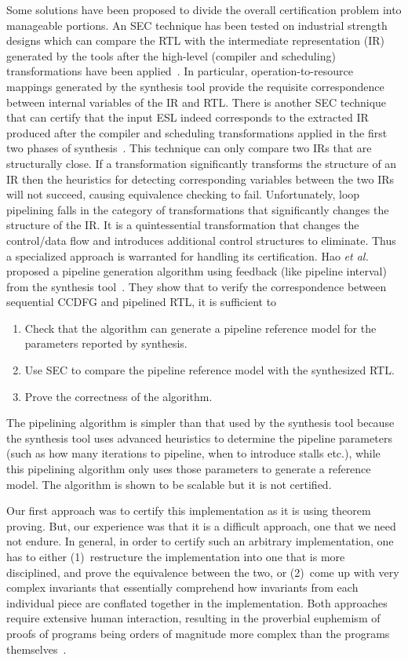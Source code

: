 Some solutions have been proposed to divide the overall certification problem into manageable portions.
An SEC technique has been tested on industrial strength designs which can compare the RTL 
with the intermediate representation (IR) generated by the tools after the high-level (compiler and scheduling)
transformations have been applied~\cite{rhcxy:atva-09,hxry:date-10}.  In particular,
operation-to-resource mappings generated by the synthesis
tool provide the requisite correspondence between internal
variables of the IR and RTL. There is another SEC technique that 
can certify that the input ESL indeed corresponds to the extracted 
IR produced after the compiler and scheduling transformations applied in the
first two phases of synthesis~\cite{zhenkun:iccd-13}. This technique
can only compare two IRs that are structurally close.  If a
transformation significantly transforms the structure of an IR then
the heuristics for detecting corresponding variables between the two
IRs will not succeed, causing equivalence checking to fail.
Unfortunately, loop pipelining falls in the category of
transformations that significantly changes the structure of the IR.
It is a quintessential transformation that changes the control/data
flow and introduces additional control structures
to eliminate. Thus a specialized approach is warranted for
handling its certification. Hao {\em et al.} proposed a pipeline generation algorithm using feedback (like pipeline interval) from the synthesis tool~\cite{hrx:dac-12}. 
They show that to verify the correspondence between sequential CCDFG and pipelined RTL, it is sufficient to
\begin{enumerate} 
\item Check that the algorithm can generate a pipeline reference model for the parameters reported by synthesis.
\item Use SEC to compare the pipeline reference model with the synthesized RTL.
\item Prove the correctness of the algorithm. 
\end{enumerate}
The pipelining algorithm is simpler than that used by the synthesis tool because the synthesis tool uses advanced heuristics to determine the pipeline parameters (such as how many iterations to pipeline, when to introduce stalls etc.), while this pipelining algorithm only uses those parameters to generate a reference model. The algorithm is shown to be scalable but it is not certified. 

Our first approach was to certify this implementation as it is using theorem proving. 
But, our experience was that it is a difficult approach, one that we need not endure. 
In general, in order to certify such an arbitrary implementation,
one has to either (1)~restructure the implementation into
one that is more disciplined, and prove the equivalence
between the two, or (2)~come up with very complex
invariants that essentially comprehend how invariants from
each individual piece are conflated together in the
implementation.  Both approaches require extensive human
interaction, resulting in the proverbial euphemism of proofs
of programs being orders of magnitude more complex than the
programs themselves~\cite{liu}.

